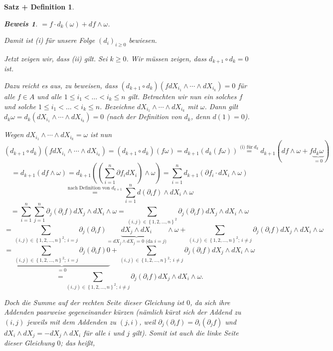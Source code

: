 \documentclass[a4paper,12pt]{scrbook}
\theoremstyle{break}
\newtheorem{SatzDef}[Satz]{Satz + Definition}
\theoremstyle{nonumberbreak}
\newtheorem{Bew}{Beweis}
\theoremstyle{nonumberplain}
\begin{document}
\begin{SatzDef}
\begin{Bew}
$= f \cdot d_k(\omega) + df \wedge \omega$.

Damit ist (i) für unsere Folge $\left(d_i\right)_{i\geq 0}$ bewiesen.

Jetzt zeigen wir, dass (ii) gilt. Sei $k\geq 0$. Wir müssen zeigen, dass $d_{k+1}\circ d_k=0$ ist.

Dazu reicht es aus, zu beweisen, dass $\left(d_{k+1}\circ d_k\right)\left(fdX_{i_1}\wedge \cdots \wedge dX_{i_k}\right) = 0$ für alle $f\in A$ und alle $1\leq i_1<\dots<i_k\leq n$ gilt. Betrachten wir nun ein solches $f$ und solche $1\leq i_1<\dots<i_k\leq n$. Bezeichne $dX_{i_1}\wedge \cdots \wedge dX_{i_k}$ mit $\omega$. Dann gilt $d_k\omega = d_k (dX_{i_1}\wedge \cdots \wedge dX_{i_k}) = 0$ (nach der Definition von $d_k$, denn $d\left(1\right) = 0$).

Wegen $dX_{i_1}\wedge \cdots \wedge dX_{i_k} = \omega$ ist nun
\[
\left(d_{k+1}\circ d_k\right)\left(fdX_{i_1}\wedge \cdots \wedge dX_{i_k}\right) 
=\left(d_{k+1}\circ d_k\right)\left(f\omega\right) = d_{k+1}\left(d_k\left(f\omega\right)\right)
\stackrel{\textrm{(i)\ für}\ d_k}{=}d_{k+1}(df\wedge \omega +f\underbrace{d_k\omega}_{=0})
\]
\[
=d_{k+1}(df\wedge \omega) 
=d_{k+1}\left(\left(\sum_{i=1}^{n}\partial f_i dX_i\right)\wedge \omega\right)
=\sum_{i=1}^{n} d_{k+1}\left(\partial f_i \cdot dX_i\wedge \omega\right)
\]
\[
\stackrel{\text{nach Definition von }d_{k+1}}{=}\sum_{i=1}^{n}d(\partial_i f) \wedge dX_i\wedge \omega
\]
\[
=\sum_{i=1}^n \sum_{j=1}^n \partial_j (\partial_i f)dX_j\wedge dX_{i}\wedge \omega
= \sum_{\left(i,j\right)\in\left\{1,2,...,n\right\}^2} \partial_j (\partial_i f) dX_j \wedge dX_i \wedge \omega
\]
\[
= \sum_{\left(i,j\right)\in\left\{1,2,...,n\right\}^2;\ i=j} \partial_j (\partial_i f) \underbrace{dX_j \wedge dX_i}_{= dX_j\wedge dX_j = 0\text{ (da }i=j\text{)}} \wedge \omega + \sum_{\left(i,j\right)\in\left\{1,2,...,n\right\}^2;\ i\neq j} \partial_j (\partial_i f) dX_j \wedge dX_i \wedge \omega
\]
\[
= \underbrace{\sum_{\left(i,j\right)\in\left\{1,2,...,n\right\}^2;\ i=j} \partial_j (\partial_i f) 0}_{=0} + \sum_{\left(i,j\right)\in\left\{1,2,...,n\right\}^2;\ i\neq j} \partial_j (\partial_i f) dX_j \wedge dX_i \wedge \omega  
\]
\[
= \sum_{\left(i,j\right)\in\left\{1,2,...,n\right\}^2;\ i\neq j} \partial_j (\partial_i f) dX_j \wedge dX_i \wedge \omega  .
\]

Doch die Summe auf der rechten Seite dieser Gleichung ist $0$, da sich ihre Addenden paarweise gegeneinander kürzen (nämlich kürzt sich der Addend zu $\left(i,j\right)$ jeweils mit dem Addenden zu $\left(j,i\right)$, weil $\partial_j(\partial_i f) = \partial_i(\partial_j f)$ und $dX_i\wedge dX_j=-dX_j\wedge dX_i$ für alle $i$ und $j$ gilt). Somit ist auch die linke Seite dieser Gleichung $0$; das heißt,


\end{Bew}
\end{SatzDef}
\end{document}
